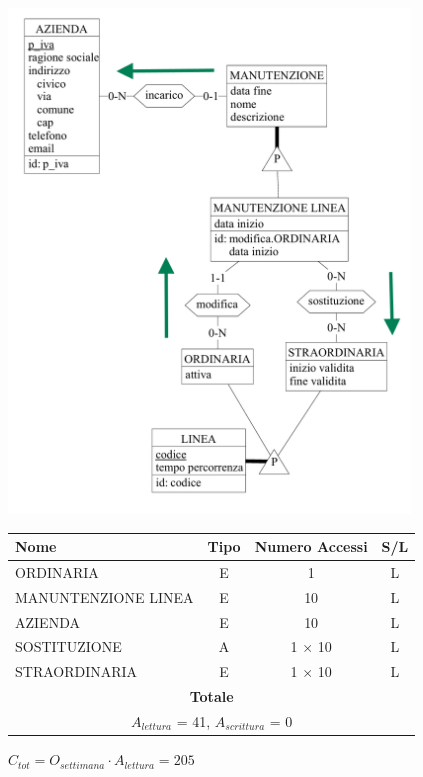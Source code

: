\documentclass[12pt,a4paper]{report}
\begin{document}
\begin{enumerate}[label=\textbf{\arabic*}]
	\begin{center}
	\includegraphics[width=0.8\textwidth]{VisualManunLinee}
	\end{center}
	\begin{table}[H]
	\centering
	\begin{tabular}{|l|c|c|c|}
	\hline
	Nome & Tipo & Numero Accessi & S/L \\
	\hline
	ORDINARIA & E & 1 & L \\
	\hline
	MANUNTENZIONE LINEA & E & 10 & L \\
	\hline
	AZIENDA & E & 10 & L \\
	\hline
	SOSTITUZIONE & A & 1 $\times$ 10 & L \\
	\hline
	STRAORDINARIA & E & 1 $\times$ 10 & L \\
          \hline
          \multicolumn{4}{c}{\textbf{Totale}} \\
          \multicolumn{4}{c}{${A_{lettura}}$ = 41, ${A_{scrittura}}$ = 0} \\
          \hline
	\end{tabular}
	\end{table}
	    \begin{center}
	    ${C_{tot} = {O_{settimana}}\cdot{A_{lettura}}= 205}$
	    \end{center}



\end{enumerate}
\end{document}
